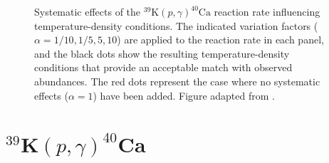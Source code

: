 \begin{figure}[t]
\centering
\noindent
{}
\caption{\label{fig:39K_p_g_Sens}Systematic effects of the $^{39}\mathrm{K}(p,\gamma)^{40}\mathrm{Ca}$ reaction rate influencing temperature-density conditions. The indicated variation factors ($\alpha = 1/10, 1/5, 5, 10$) are applied to the reaction rate in each panel, and the black dots show the resulting temperature-density conditions that provide an acceptable match with observed abundances. The red dots represent the case where no systematic effects ($\alpha=1$) have been added. Figure adapted from \cite{Dermigny2017}.}
\end{figure}

\section{$^{39}\mathrm{\textbf{K}}(p,\gamma)^{40}\mathrm{\textbf{Ca}}$}


